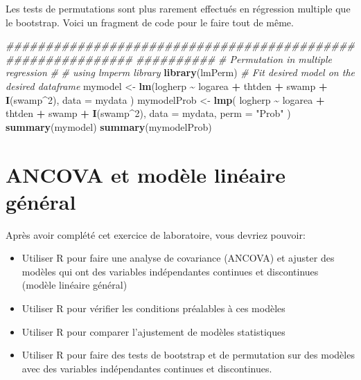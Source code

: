 \documentclass[
  12pt,
]{book}
\newenvironment{Shaded}{\begin{snugshade}}{\end{snugshade}}
\newcommand{\CommentTok}[1]{\textcolor[rgb]{0.56,0.35,0.01}{\textit{#1}}}
\newcommand{\DataTypeTok}[1]{\textcolor[rgb]{0.13,0.29,0.53}{#1}}
\newcommand{\DecValTok}[1]{\textcolor[rgb]{0.00,0.00,0.81}{#1}}
\newcommand{\KeywordTok}[1]{\textcolor[rgb]{0.13,0.29,0.53}{\textbf{#1}}}
\newcommand{\NormalTok}[1]{#1}
\newcommand{\OperatorTok}[1]{\textcolor[rgb]{0.81,0.36,0.00}{\textbf{#1}}}
\newcommand{\StringTok}[1]{\textcolor[rgb]{0.31,0.60,0.02}{#1}}
\providecommand{\tightlist}{%
  \setlength{\itemsep}{0pt}\setlength{\parskip}{0pt}}
\begin{document}
Les tests de permutations sont plus rarement effectués en régression multiple que le bootstrap. Voici un fragment de code pour le faire tout de même.

\begin{Shaded}
\begin{Highlighting}[]
\CommentTok{\#\#\#\#\#\#\#\#\#\#\#\#\#\#\#\#\#\#\#\#\#\#\#\#\#\#\#\#\#\#\#\#\#\#\#\#\#\#\#\#\#\#\#\#\#\#\#\#\#\#\#\#\#\#\#\#\#\#\#\#}
\CommentTok{\#\#\#\#\#\#\#\#\#\#}
\CommentTok{\# Permutation in multiple regression}
\CommentTok{\#}
\CommentTok{\# using lmperm library}
\KeywordTok{library}\NormalTok{(lmPerm)}
\CommentTok{\# Fit desired model on the desired dataframe}
\NormalTok{mymodel \textless{}{-}}\StringTok{ }\KeywordTok{lm}\NormalTok{(logherp }\OperatorTok{\textasciitilde{}}\StringTok{ }\NormalTok{logarea }\OperatorTok{+}\StringTok{ }\NormalTok{thtden }\OperatorTok{+}\StringTok{ }\NormalTok{swamp }\OperatorTok{+}\StringTok{ }\KeywordTok{I}\NormalTok{(swamp}\OperatorTok{\^{}}\DecValTok{2}\NormalTok{),}
  \DataTypeTok{data =}\NormalTok{ mydata}
\NormalTok{)}
\NormalTok{mymodelProb \textless{}{-}}\StringTok{ }\KeywordTok{lmp}\NormalTok{(}
\NormalTok{  logherp }\OperatorTok{\textasciitilde{}}\StringTok{ }\NormalTok{logarea }\OperatorTok{+}\StringTok{ }\NormalTok{thtden }\OperatorTok{+}\StringTok{ }\NormalTok{swamp }\OperatorTok{+}\StringTok{ }\KeywordTok{I}\NormalTok{(swamp}\OperatorTok{\^{}}\DecValTok{2}\NormalTok{),}
  \DataTypeTok{data =}\NormalTok{ mydata, }\DataTypeTok{perm =} \StringTok{"Prob"}
\NormalTok{)}
\KeywordTok{summary}\NormalTok{(mymodel)}
\KeywordTok{summary}\NormalTok{(mymodelProb)}
\end{Highlighting}
\end{Shaded}

\hypertarget{ancova-et-moduxe8le-linuxe9aire-guxe9nuxe9ral}{%
\chapter{ANCOVA et modèle linéaire général}\label{ancova-et-moduxe8le-linuxe9aire-guxe9nuxe9ral}}

Après avoir complété cet exercice de laboratoire, vous devriez pouvoir:

\begin{itemize}
\tightlist
\item
  Utiliser R pour faire une analyse de covariance (ANCOVA) et ajuster des modèles qui ont des variables indépendantes continues et discontinues (modèle linéaire général)
\item
  Utiliser R pour vérifier les conditions préalables à ces modèles
\item
  Utiliser R pour comparer l'ajustement de modèles statistiques
\item
  Utiliser R pour faire des tests de bootstrap et de permutation sur des modèles avec des variables indépendantes continues et discontinues.
\end{itemize}
\end{document}
